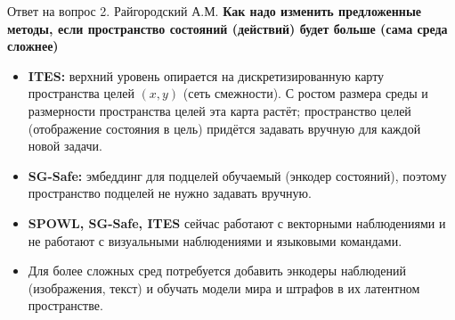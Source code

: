 
\begin{frame}[noframenumbering]{Ответ на вопрос 2. Райгородский А.М.}
    \textbf{Как надо изменить предложенные методы, если пространство состояний (действий) будет больше (сама среда сложнее)}

    \vspace{0.4em}
    \begin{itemize}
        \item \textbf{ITES:} верхний уровень опирается на дискретизированную
              карту пространства целей $(x,y)$ (сеть смежности). С ростом
              размера среды и размерности пространства целей эта карта
              растёт; пространство целей (отображение состояния в цель)
              придётся задавать вручную для каждой новой задачи.
        \item \textbf{SG-Safe:} эмбеддинг для подцелей обучаемый (энкодер
              состояний), поэтому пространство подцелей не нужно задавать
              вручную.
        \item \textbf{SPOWL, SG-Safe, ITES} сейчас работают с векторными
              наблюдениями и не работают с визуальными наблюдениями и
              языковыми командами.
        \item Для более сложных сред потребуется добавить энкодеры
              наблюдений (изображения, текст) и обучать модели мира и штрафов
              в их латентном пространстве.
    \end{itemize}
\end{frame}


